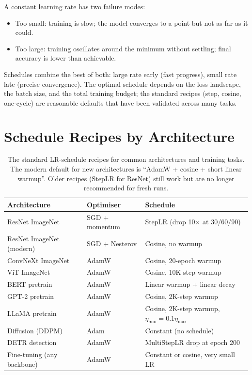 A constant learning rate has two failure modes:
\begin{itemize}
  \item Too small: training is slow; the model converges to a
    point but not as far as it could.
  \item Too large: training oscillates around the minimum without
    settling; final accuracy is lower than achievable.
\end{itemize}

Schedules combine the best of both: large rate early (fast
progress), small rate late (precise convergence). The optimal
schedule depends on the loss landscape, the batch size, and the
total training budget; the standard recipes (step, cosine,
one-cycle) are reasonable defaults that have been validated
across many tasks.

\section{Schedule Recipes by Architecture}
\label{sec:lr_schedulers:recipes}

\begin{table}[t]
\centering
\small
\begin{tabular}{lll}
\toprule
Architecture & Optimiser & Schedule \\
\midrule
ResNet ImageNet            & SGD + momentum  & StepLR (drop 10$\times$ at 30/60/90) \\
ResNet ImageNet (modern)   & SGD + Nesterov  & Cosine, no warmup \\
ConvNeXt ImageNet          & AdamW           & Cosine, 20-epoch warmup \\
ViT ImageNet               & AdamW           & Cosine, 10K-step warmup \\
BERT pretrain              & AdamW           & Linear warmup + linear decay \\
GPT-2 pretrain             & AdamW           & Cosine, 2K-step warmup \\
LLaMA pretrain             & AdamW           & Cosine, 2K-step warmup, $\eta_{\min} = 0.1 \eta_{\max}$ \\
Diffusion (DDPM)           & Adam            & Constant (no schedule) \\
DETR detection             & AdamW           & MultiStepLR drop at epoch 200 \\
Fine-tuning (any backbone) & AdamW           & Constant or cosine, very small LR \\
\bottomrule
\end{tabular}
\caption[LR schedule by architecture.]{The standard
LR-schedule recipes for common architectures and training
tasks. The modern default for new architectures is
``AdamW + cosine + short linear warmup''. Older recipes
(StepLR for ResNet) still work but are no longer recommended
for fresh runs.}
\label{tab:lr_schedulers:recipes}
\end{table}

